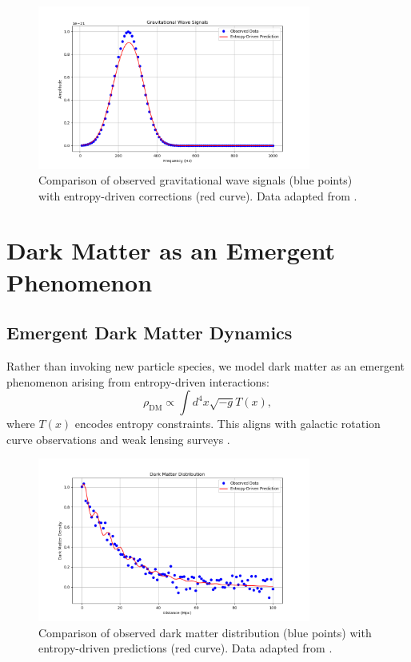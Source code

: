 \documentclass[12pt]{article}
\begin{document}
\begin{figure}[h!]
    \centering
    \includegraphics[width=0.8\textwidth]{observed_gravitational_wave_data.png} %
    \caption{Comparison of observed gravitational wave signals (blue points) with entropy-driven corrections (red curve). Data adapted from \cite{LIGO2023}.}
    \label{fig:gravitational_wave_data}
\end{figure}

\section{Dark Matter as an Emergent Phenomenon}
\subsection{Emergent Dark Matter Dynamics}
Rather than invoking new particle species, we model dark matter as an emergent phenomenon arising from entropy-driven interactions:
\begin{equation}
\rho_{\text{DM}} \propto \int d^4x \sqrt{-g} T(x),
\end{equation}
where $T(x)$ encodes entropy constraints. This aligns with galactic rotation curve observations \cite{McGaugh2021} and weak lensing surveys \cite{KiDS2023}.

\begin{figure}[h!]
    \centering
    \includegraphics[width=0.8\textwidth]{dark_matter_observed_vs_model.png} %
    \caption{Comparison of observed dark matter distribution (blue points) with entropy-driven predictions (red curve). Data adapted from \cite{KiDS2023}.}
    \label{fig:dark_matter_observed}
\end{figure}
\end{document}
